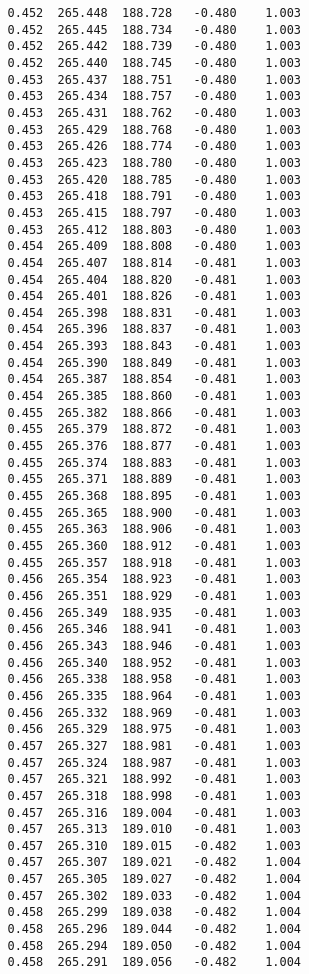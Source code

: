 \begin{verbatim}
   0.452  265.448  188.728   -0.480    1.003
   0.452  265.445  188.734   -0.480    1.003
   0.452  265.442  188.739   -0.480    1.003
   0.452  265.440  188.745   -0.480    1.003
   0.453  265.437  188.751   -0.480    1.003
   0.453  265.434  188.757   -0.480    1.003
   0.453  265.431  188.762   -0.480    1.003
   0.453  265.429  188.768   -0.480    1.003
   0.453  265.426  188.774   -0.480    1.003
   0.453  265.423  188.780   -0.480    1.003
   0.453  265.420  188.785   -0.480    1.003
   0.453  265.418  188.791   -0.480    1.003
   0.453  265.415  188.797   -0.480    1.003
   0.453  265.412  188.803   -0.480    1.003
   0.454  265.409  188.808   -0.480    1.003
   0.454  265.407  188.814   -0.481    1.003
   0.454  265.404  188.820   -0.481    1.003
   0.454  265.401  188.826   -0.481    1.003
   0.454  265.398  188.831   -0.481    1.003
   0.454  265.396  188.837   -0.481    1.003
   0.454  265.393  188.843   -0.481    1.003
   0.454  265.390  188.849   -0.481    1.003
   0.454  265.387  188.854   -0.481    1.003
   0.454  265.385  188.860   -0.481    1.003
   0.455  265.382  188.866   -0.481    1.003
   0.455  265.379  188.872   -0.481    1.003
   0.455  265.376  188.877   -0.481    1.003
   0.455  265.374  188.883   -0.481    1.003
   0.455  265.371  188.889   -0.481    1.003
   0.455  265.368  188.895   -0.481    1.003
   0.455  265.365  188.900   -0.481    1.003
   0.455  265.363  188.906   -0.481    1.003
   0.455  265.360  188.912   -0.481    1.003
   0.455  265.357  188.918   -0.481    1.003
   0.456  265.354  188.923   -0.481    1.003
   0.456  265.351  188.929   -0.481    1.003
   0.456  265.349  188.935   -0.481    1.003
   0.456  265.346  188.941   -0.481    1.003
   0.456  265.343  188.946   -0.481    1.003
   0.456  265.340  188.952   -0.481    1.003
   0.456  265.338  188.958   -0.481    1.003
   0.456  265.335  188.964   -0.481    1.003
   0.456  265.332  188.969   -0.481    1.003
   0.456  265.329  188.975   -0.481    1.003
   0.457  265.327  188.981   -0.481    1.003
   0.457  265.324  188.987   -0.481    1.003
   0.457  265.321  188.992   -0.481    1.003
   0.457  265.318  188.998   -0.481    1.003
   0.457  265.316  189.004   -0.481    1.003
   0.457  265.313  189.010   -0.481    1.003
   0.457  265.310  189.015   -0.482    1.003
   0.457  265.307  189.021   -0.482    1.004
   0.457  265.305  189.027   -0.482    1.004
   0.457  265.302  189.033   -0.482    1.004
   0.458  265.299  189.038   -0.482    1.004
   0.458  265.296  189.044   -0.482    1.004
   0.458  265.294  189.050   -0.482    1.004
   0.458  265.291  189.056   -0.482    1.004

\end{verbatim}
